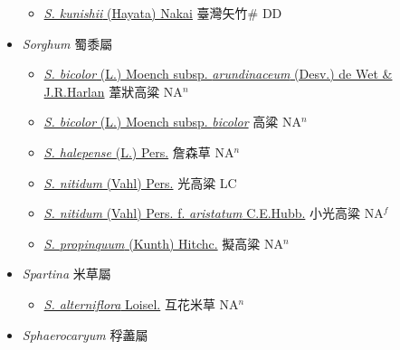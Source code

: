 \begin{itemize}
  \begin{itemize}
        \item[] \href{http://www.theplantlist.org/tpl1.1/search?q=Sinobambusa+kunishii}{\textit{S. kunishii} (Hayata) Nakai}   臺灣矢竹\# DD
  \end{itemize}
 \item[] \textit{Sorghum} 蜀黍屬
                    
  \begin{itemize}
        \item[] \href{http://www.theplantlist.org/tpl1.1/search?q=Sorghum+bicolor+subsp.+arundinaceum}{\textit{S. bicolor} (L.) Moench subsp. \textit{arundinaceum} (Desv.) de Wet \& J.R.Harlan}   葦狀高粱 NA$^n$
        \item[] \href{http://www.theplantlist.org/tpl1.1/search?q=Sorghum+bicolor+subsp.+bicolor}{\textit{S. bicolor} (L.) Moench subsp. \textit{bicolor}}   高粱 NA$^n$
        \item[] \href{http://www.theplantlist.org/tpl1.1/search?q=Sorghum+halepense}{\textit{S. halepense} (L.) Pers.}   詹森草 NA$^n$
        \item[] \href{http://www.theplantlist.org/tpl1.1/search?q=Sorghum+nitidum}{\textit{S. nitidum} (Vahl) Pers.}   光高粱 LC
        \item[] \href{http://www.theplantlist.org/tpl1.1/search?q=Sorghum+nitidum+ f. +aristatum}{\textit{S. nitidum} (Vahl) Pers.  f.  \textit{aristatum} C.E.Hubb.}   小光高粱 NA$^f$
        \item[] \href{http://www.theplantlist.org/tpl1.1/search?q=Sorghum+propinquum}{\textit{S. propinquum} (Kunth) Hitchc.}   擬高粱 NA$^n$
  \end{itemize}
 \item[] \textit{Spartina} 米草屬
                    
  \begin{itemize}
        \item[] \href{http://www.theplantlist.org/tpl1.1/search?q=Spartina+alterniflora}{\textit{S. alterniflora} Loisel.}   互花米草 NA$^n$
  \end{itemize}
 \item[] \textit{Sphaerocaryum} 稃藎屬
                    

\end{itemize}
